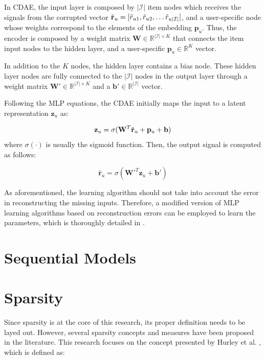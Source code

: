     In CDAE, the input layer is composed by $|\mathcal{I}|$ item nodes which receives the signals from the corrupted vector $\Tilde{\mathbf{r}}_u = [\Tilde{r}_{u1}, \Tilde{r}_{u2}, \ldots \Tilde{r}_{u|\mathcal{I}|}]$, and a user-specific node whose weights correspond to the elements of the embedding $\mathbf{p}_u$. Thus, the encoder is composed by a weight matrix $\mathbf{W} \in \mathbb{R}^{|\mathcal{I}| \times K}$ that connects the item input nodes to the hidden layer, and a user-specific $\mathbf{p}_u \in \mathbb{R}^K$ vector. 

    In addition to the $K$ nodes, the hidden layer contains a bias node. These hidden layer nodes are fully connected to the $|\mathcal{I}|$ nodes in the output layer through a weight matrix $\mathbf{W}' \in \mathbb{R}^{|\mathcal{I}| \times K}$ and a $\mathbf{b}' \in \mathbb{R}^{|\mathcal{I}|}$ vector. 
    
    Following the MLP equations, the CDAE initially maps the input to a latent representation $\mathbf{z}_u$ as:
    
    \begin{equation*}
        \mathbf{z}_u = \sigma(\mathbf{W}^T \Tilde{\mathbf{r}}_{u} + \mathbf{p}_u + \mathbf{b})
    \end{equation*} where $\sigma(\cdot)$ is usually the sigmoid function. Then, the output signal is computed as follows:
    
    \begin{equation*}
        \hat{\mathbf{r}}_{u} = \sigma(\mathbf{W}'^T\mathbf{z}_u + \mathbf{b}')
    \end{equation*}

    As aforementioned, the learning algorithm should not take into account the error in reconstructing the missing inputs. Therefore, a modified version of MLP learning algorithms based on reconstruction errors can be employed to learn the parameters, which is thoroughly detailed in \cite{10.1145/2835776.2835837}.

\section{Sequential Models}

\section{Sparsity}

    Since sparsity is at the core of this research, its proper definition needs to be layed out. However, several sparsity concepts and measures have been proposed in the literature. This research focuses on the concept presented by Hurley et al. \cite{10.1109/TIT.2009.2027527}, which is defined as: 
    
